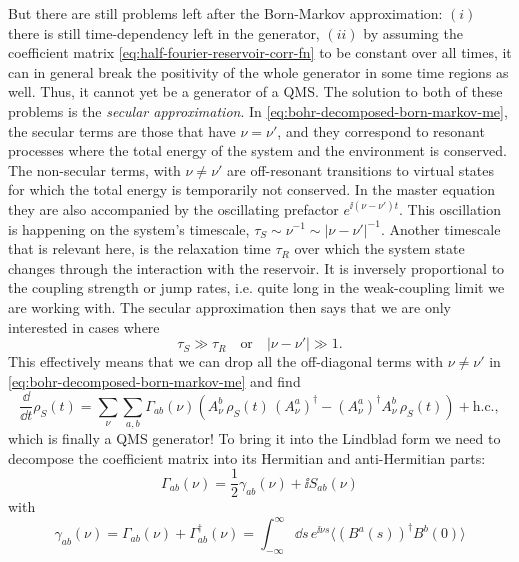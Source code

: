 But there are still problems left after the Born-Markov approximation: $(i)$ there is still time-dependency left in the generator, $(ii)$ by assuming the coefficient matrix \eqref{eq:half-fourier-reservoir-corr-fn} to be constant over all times, it can in general break the positivity of the whole generator in some time regions as well. Thus, it cannot yet be a generator of a QMS. The solution to both of these problems is the \textit{secular approximation}. In \eqref{eq:bohr-decomposed-born-markov-me}, the secular terms are those that have $\nu = \nu'$, and they correspond to resonant processes where the total energy of the system and the environment is conserved. The non-secular terms, with $\nu \neq \nu'$ are off-resonant transitions to virtual states for which the total energy is temporarily not conserved. In the master equation they are also accompanied by the oscillating prefactor $e^{\ii(\nu - \nu')t}$. This oscillation is happening on the system's timescale, $\tau_S \sim \nu^{-1} \sim |\nu - \nu'|^{-1}$. Another timescale that is relevant here, is the relaxation time $\tau_R$ over which the system state changes through the interaction with the reservoir. It is inversely proportional to the coupling strength or jump rates, i.e. quite long in the weak-coupling limit we are working with. The secular approximation then says that we are only interested in cases where
\begin{equation}
    \label{eq:secular-approx}
    \tau_S \gg \tau_R \quad\text{or}\quad {|\nu - \nu'|} \gg 1.
\end{equation}
This effectively means that we can drop all the off-diagonal terms with $\nu \neq \nu'$ in \eqref{eq:bohr-decomposed-born-markov-me} and find
\begin{equation}
    \label{eq:after-secular-me}
    \frac{\dd}{\dd t}\rho_S(t) = \sum_{\nu}\sum_{a, b}\Gamma_{ab}(\nu)\left(A^b_\nu\, \rho_S(t)\, (A^{a}_{\nu})^\dagger - (A^a_{\nu})^\dagger A_{\nu}^b\, \rho_S(t)\right) + \text{h.c.},
\end{equation}
which is finally a QMS generator! To bring it into the Lindblad form we need to decompose the coefficient matrix into its Hermitian and anti-Hermitian parts:
\begin{equation}
    \Gamma_{ab}(\nu) = \frac{1}{2}\gamma_{ab}(\nu) + \ii S_{ab}(\nu)
\end{equation} 
with
\begin{equation}
    \gamma_{ab}(\nu) = \Gamma_{ab}(\nu) + \Gamma_{ab}^\dagger(\nu)
    = \int_{-\infty}^{\infty}\dd s\, e^{\ii\nu s}\langle (B^a(s))^\dagger B^b(0)\rangle
\end{equation}
